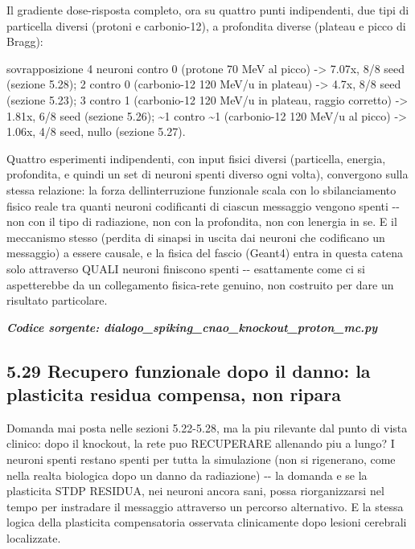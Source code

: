 \documentclass[
  italian,
]{article}
\begin{document}
Il gradiente dose-risposta completo, ora su quattro punti indipendenti, due tipi di particella diversi (protoni e carbonio-12), a profondita\textquotesingle{} diverse (plateau e picco di Bragg):

sovrapposizione 4 neuroni contro 0 (protone 70 MeV al picco) -\textgreater{} 7.07x, 8/8 seed (sezione 5.28); 2 contro 0 (carbonio-12 120 MeV/u in plateau) -\textgreater{} 4.7x, 8/8 seed (sezione 5.23); 3 contro 1 (carbonio-12 120 MeV/u in plateau, raggio corretto) -\textgreater{} 1.81x, 6/8 seed (sezione 5.26); \textasciitilde1 contro \textasciitilde1 (carbonio-12 120 MeV/u al picco) -\textgreater{} 1.06x, 4/8 seed, nullo (sezione 5.27).

Quattro esperimenti indipendenti, con input fisici diversi (particella, energia, profondita\textquotesingle, e quindi un set di neuroni spenti diverso ogni volta), convergono sulla stessa relazione: la forza dell\textquotesingle interruzione funzionale scala con lo sbilanciamento fisico reale tra quanti neuroni codificanti di ciascun messaggio vengono spenti -\/- non con il tipo di radiazione, non con la profondita\textquotesingle, non con l\textquotesingle energia in se\textquotesingle. E\textquotesingle{} il meccanismo stesso (perdita di sinapsi in uscita dai neuroni che codificano un messaggio) a essere causale, e la fisica del fascio (Geant4) entra in questa catena solo attraverso QUALI neuroni finiscono spenti -\/- esattamente come ci si aspetterebbe da un collegamento fisica-rete genuino, non costruito per dare un risultato particolare.

\textit{\textbf{Codice sorgente: dialogo\_\allowbreak{}spiking\_\allowbreak{}cnao\_\allowbreak{}knockout\_\allowbreak{}proton\_\allowbreak{}mc.py}}


\subsection{5.29 Recupero funzionale dopo il danno: la plasticita\textquotesingle{} residua compensa, non ripara}\label{recupero-funzionale-dopo-il-danno-la-plasticita-residua-compensa-non-ripara}

Domanda mai posta nelle sezioni 5.22-5.28, ma la piu\textquotesingle{} rilevante dal punto di vista clinico: dopo il knockout, la rete puo\textquotesingle{} RECUPERARE allenando piu\textquotesingle{} a lungo? I neuroni spenti restano spenti per tutta la simulazione (non si rigenerano, come nella realta\textquotesingle{} biologica dopo un danno da radiazione) -\/- la domanda e\textquotesingle{} se la plasticita\textquotesingle{} STDP RESIDUA, nei neuroni ancora sani, possa riorganizzarsi nel tempo per instradare il messaggio attraverso un percorso alternativo. E\textquotesingle{} la stessa logica della plasticita\textquotesingle{} compensatoria osservata clinicamente dopo lesioni cerebrali localizzate.
\end{document}
